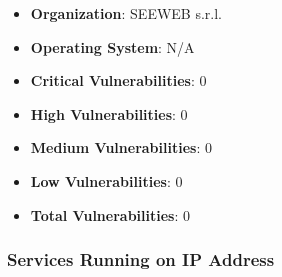 \documentclass{article}
\begin{document}
\begin{itemize}
    \item \textbf{Organization}: SEEWEB s.r.l.
    \item \textbf{Operating System}:  N/A 
    \item \textbf{Critical Vulnerabilities}: 0
    \item \textbf{High Vulnerabilities}: 0
    \item \textbf{Medium Vulnerabilities}: 0
    \item \textbf{Low Vulnerabilities}: 0
    \item \textbf{Total Vulnerabilities}: 0
\end{itemize}

\subsubsection*{Services Running on IP Address}
\end{document}

